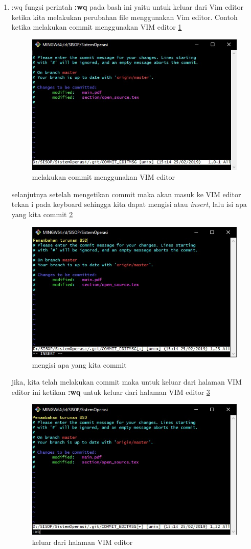 \begin{enumerate}
\item :wq
	fungsi perintah \textbf{:wq} pada bash ini yaitu untuk keluar dari Vim editor ketika kita melakukan perubahan file menggunakan Vim editor.
Contoh ketika melakukan commit menggunakan VIM editor \ref{ss1}
\begin{figure}[!htbp]
\centerline{\includegraphics[width=.75\textwidth]{Figures/ss1.jpg}}
\caption{melakukan commit menggunakan VIM editor}
\label{ss1}
\end{figure}

selanjutnya setelah mengetikan commit maka akan masuk ke VIM editor tekan i pada keyboard sehingga kita dapat mengisi atau \textit{insert}, lalu isi apa yang kita commit \ref{ss2}
\begin{figure}[!htbp]
\centerline{\includegraphics[width=.75\textwidth]{Figures/ss2.jpg}}
\caption{mengisi apa yang kita commit}
\label{ss2}
\end{figure}

jika, kita telah melakukan commit maka untuk keluar dari halaman VIM editor ini ketikan \textbf{:wq} untuk keluar dari halaman VIM editor \ref{ss3}
\begin{figure}[!htbp]
\centerline{\includegraphics[width=.75\textwidth]{Figures/ss3.jpg}}
\caption{keluar dari halaman VIM editor}
\label{ss3}
\end{figure}
\end{enumerate}

 
